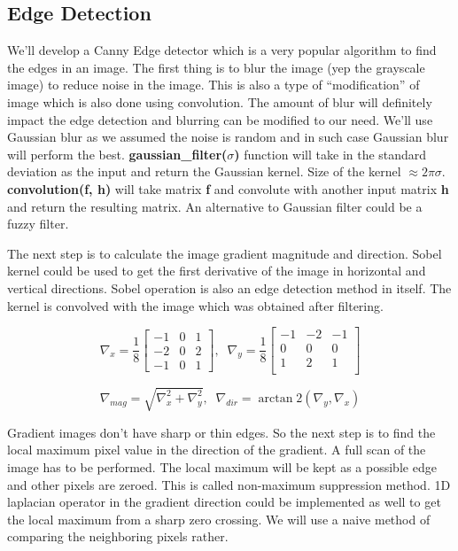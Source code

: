 \documentclass[12pt]{report}%
\theoremstyle{definition}  %
\begin{document}
\subsection{Edge Detection}
\hspace{\parindent}We'll develop a Canny Edge detector which is a very popular algorithm to find the edges in an image. The first thing is to blur the image (yep the grayscale image) to reduce noise in the image. This is also a type of ``modification'' of image which is also done using convolution. The amount of blur will definitely impact the edge detection and blurring can be modified to our need. We'll use Gaussian blur as we assumed the noise is random and in such case Gaussian blur will perform the best. \textbf{gaussian\_filter($\sigma$)} function will take in the standard deviation as the input and return the Gaussian kernel. Size of the kernel $\approx 2\pi\sigma$. \textbf{convolution(f, h)} will take matrix \textbf{f} and convolute with another input matrix \textbf{h} and return the resulting matrix. An alternative to Gaussian filter could be a fuzzy filter.

The next step is to calculate the image gradient magnitude and direction. Sobel kernel could be used to get the first derivative of the image in horizontal and vertical directions. Sobel operation is also an edge detection method in itself. The kernel is convolved with the image which was obtained after filtering.

\begin{equation}
\nabla_x = \frac{1}{8}
\begin{bmatrix}
-1 & 0 & 1\\
-2 & 0 & 2\\
-1 & 0 & 1
\end{bmatrix},\;\;
\nabla_y = \frac{1}{8}
\begin{bmatrix}
-1 & -2  & -1\\
 0 &  0  &  0\\
 1 &  2  &  1\\
\end{bmatrix}
\end{equation}

\begin{equation}
\nabla_{mag} = \sqrt{\nabla_x^{2} + \nabla_y^{2}},\;\;
\nabla_{dir} = \arctan2(\nabla_y, \nabla_x)
\end{equation}

Gradient images don't have sharp or thin edges. So the next step is to find the local maximum pixel value in the direction of the gradient. A full scan of the image has to be performed. The local maximum will be kept as a possible edge and other pixels are zeroed. This is called non-maximum suppression method. 1D laplacian operator in the gradient direction could be implemented as well to get the local maximum from a sharp zero crossing. We will use a naive method of comparing the neighboring pixels rather.
\end{document}
